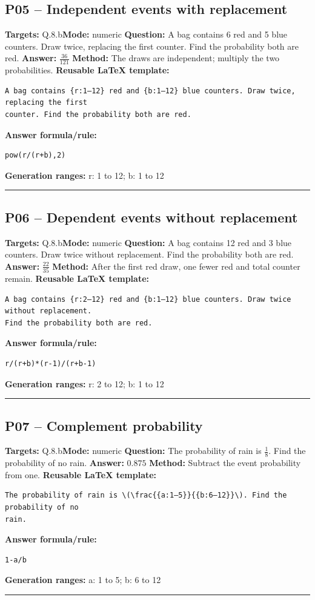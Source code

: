\documentclass[11pt]{article}
\begin{document}
\subsection{P05 -- Independent events with replacement}
\textbf{Targets:} Q.8.b\quad\textbf{Mode:} numeric
\textbf{Question:} A bag contains 6 red and 5 blue counters. Draw twice, replacing the first counter. Find the probability both are red.
\textbf{Answer:} \(\frac{36}{121}\)
\textbf{Method:} The draws are independent; multiply the two probabilities.
\textbf{Reusable LaTeX template:}
\begin{verbatim}
A bag contains {r:1–12} red and {b:1–12} blue counters. Draw twice, replacing the first
counter. Find the probability both are red.
\end{verbatim}
\textbf{Answer formula/rule:}
\begin{verbatim}
pow(r/(r+b),2)
\end{verbatim}
\textbf{Generation ranges:} r: 1 to 12; b: 1 to 12
\medskip\hrule\medskip
\subsection{P06 -- Dependent events without replacement}
\textbf{Targets:} Q.8.b\quad\textbf{Mode:} numeric
\textbf{Question:} A bag contains 12 red and 3 blue counters. Draw twice without replacement. Find the probability both are red.
\textbf{Answer:} \(\frac{22}{35}\)
\textbf{Method:} After the first red draw, one fewer red and total counter remain.
\textbf{Reusable LaTeX template:}
\begin{verbatim}
A bag contains {r:2–12} red and {b:1–12} blue counters. Draw twice without replacement.
Find the probability both are red.
\end{verbatim}
\textbf{Answer formula/rule:}
\begin{verbatim}
r/(r+b)*(r-1)/(r+b-1)
\end{verbatim}
\textbf{Generation ranges:} r: 2 to 12; b: 1 to 12
\medskip\hrule\medskip
\subsection{P07 -- Complement probability}
\textbf{Targets:} Q.8.b\quad\textbf{Mode:} numeric
\textbf{Question:} The probability of rain is \(\frac{1}{8}\). Find the probability of no rain.
\textbf{Answer:} \(0.875\)
\textbf{Method:} Subtract the event probability from one.
\textbf{Reusable LaTeX template:}
\begin{verbatim}
The probability of rain is \(\frac{{a:1–5}}{{b:6–12}}\). Find the probability of no
rain.
\end{verbatim}
\textbf{Answer formula/rule:}
\begin{verbatim}
1-a/b
\end{verbatim}
\textbf{Generation ranges:} a: 1 to 5; b: 6 to 12
\medskip\hrule\medskip
\end{document}
